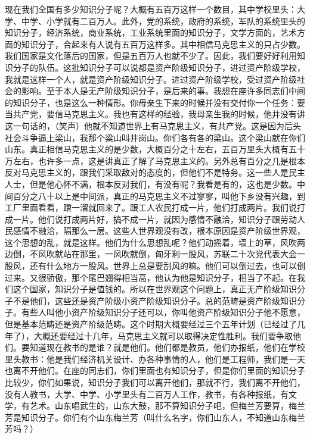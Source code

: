 现在我们全国有多少知识分子呢？大概有五百万这样一个数目，其中学校里头：大学、中学、小学就有二百万人。此外，党的系统，政府的系统，军队的系统里头的知识分子，经济系统，商业系统，工业系统里面的知识分子，文学方面的，艺术方面的知识分子，合起来有人说有五百万这样多。其中相信马克思主义的只占少数。我们国家是文化落后的国家，但是五百万人也就不少了。因此，我们要好好利用知识分子的队伍。这批知识分子可以说都是资产阶级知识分子，进过资产阶级学校，我就是这样一个人，就是资产阶级知识分子。进过资产阶级学校，受过资产阶级社会的影响。至于本人是无产阶级知识分子，是后来的事。我想在座许多同志们中间的知识分子，也是这么一种情形。你母亲生下来的时候并没有交付你一个任务：要当共产党，要信马克思主义。我也有这样的经验，我母亲生我的时候，他并没有讲这一句话的，（笑声）他就不知道世界上有马克思主义，有共产党。这是因为后头社会斗争逼上梁山，我那个粱山叫井岗山。你们各有各的梁山。这个梁山就在你们山东。真正相信马克思主义的是少数，大概百分之十左右，五百万里头大概有五十万左右，也许多一点，这是讲真正了解了马克思主义的。另外总有百分之几是根本反对马克思主义的，跟我们采取敌对的态度的，但他们不是特务。这一些人是民主人士，但是他心怀不满，根本反对我们，有没有呢？我看是有的，这也是少数。中间百分之八十以上是中间派，真正的马克思主义不过寥寥，叫他下乡没有兴趣，到工厂里面看看，蹭一溜就回来了。跟工人农民打成一片，他们打成两片。我们说打成一片。他们说打成两片好，搞不成一片，就因为感情不融洽，知识分子跟劳动人民感情不融洽，隔那么一层。这些人世界观没有改，根本原因是资产阶级世界观，这个思想的乱，就是这样。他们为什么思想乱呢？他们动摇着，墙上的草，风吹两边倒，不风吹就站在那里，一风吹就倒，匈牙利一股风，苏联二十次党代表大会一股风，还有什么地方一股风。世界上总是要刮风的嘛。他们可以倒过去，也可以倒过来。又很骄傲，那个尾巴翘得相当高，他认为他是知识分子，相当了不起。在我们这个国家，知识分子是值钱的。所以在世界观这个问题上，真正无产阶级知识分子不是他们，这些还是资产阶级小资产阶级知识分子。总的范畴是资产阶级知识分子。有些人叫他小资产阶级知识分子还可以，你叫他资产阶级知识分子他不愿意，但是基本范畴还是资产阶级范畴。这个时期大概要经过三个五年计划（已经过了几年了），大概还要经过十几年，马克思主义就可以取得决定性胜利。我们要争取他们。要知道现在教书的是谁？就是他们。他们都是教员，他们办报纸，他们在学校里头教书：他是我们经济机关设计、办各种事情的人，他们是工程师，我们是一天也离不开他们。在座的同志们，你们里面也有知识分子，但是你们里面的知识分子比较少，你们如果说，知识分子我们可以离开他们，那就不行，我们离不开他们，没有人教书，大学、中学、小学里头有二百万人工作，教书，有各种报纸，有文学，有艺术。山东唱武生的，山东大鼓，那不算知识分子吧，但梅兰芳要算，梅兰芳是知识分子。你们有个山东梅兰芳（叫什么名字，你们山东人，不知道山东梅兰芳吗？）

